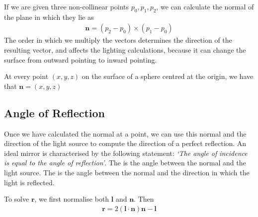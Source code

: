 \documentclass[../COS3712_Notes.tex]{subfiles}
\begin{document}
        If we are given three non-collinear points $p_0, p_1, p_2$, we can calculate the normal
        of the plane in which they lie as
        \begin{align*}
          \mathbf{n} = (p_2 - p_0) \times (p_1 - p_0)
        \end{align*}
        The order in which we multiply the vectors determines the direction of the resulting
        vector, and affects the lighting calculations, because it can change the surface
        from outward pointing to inward pointing.

        At every point $(x, y, z)$ on the surface of a sphere centred at the origin,
        we have that $\mathbf{n} = (x, y, z)$

      \subsection{Angle of Reflection}
        Once we have calculated the normal at a point, we can use this normal and the direction
        of the light source to compute the direction of a perfect reflection.
        An ideal mirror is characterised by the following statement:
        \emph{`The angle of incidence is equal to the angle of reflection'}.
        The  is the angle between the normal and the light source.
        The  is the angle between the normal and the direction
        in which the light is reflected.

        To solve $\mathbf{r}$, we first normalise both $\mathbf{l}$ and $\mathbf{n}$.
        Then
        \begin{align*}
          \mathbf{r} = 2 (\mathbf{l} \cdot \mathbf{n}) \mathbf{n} - \mathbf{l}
        \end{align*}

    \pagebreak
\end{document}
